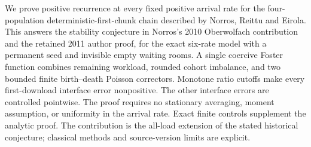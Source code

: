We prove positive recurrence at every fixed positive arrival rate for the
four-population deterministic-first-chunk chain described by Norros, Reittu
and Eirola. This answers the stability conjecture in Norros's 2010
Oberwolfach contribution and the retained 2011 author proof, for the exact
six-rate model with a permanent seed and invisible empty waiting rooms.
A single coercive Foster function combines remaining workload, rounded
cohort imbalance, and two bounded finite birth--death Poisson correctors.
Monotone ratio cutoffs make every first-download interface error
nonpositive. The other interface errors are controlled pointwise.
The proof requires no stationary averaging, moment assumption, or
uniformity in the arrival rate. Exact finite controls supplement the
analytic proof. The contribution is the all-load extension of the stated historical
conjecture; classical methods and source-version limits are explicit.
